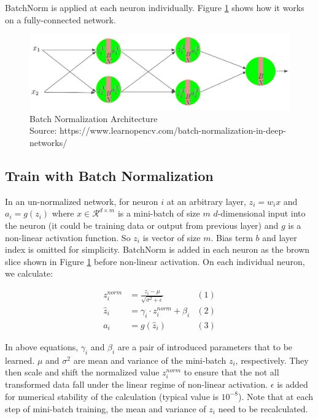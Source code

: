 \documentclass{article}
\begin{document}
BatchNorm is applied at each neuron individually. Figure \ref{fig:batchnorm} shows how it works on a fully-connected network. 


\begin{figure}[h]
	\centering
    \includegraphics[width=\textwidth]{pics/batchNorm/batch-normalization.jpg}
	\caption{Batch Normalization Architecture\\Source: https://www.learnopencv.com/batch-normalization-in-deep-networks/}
	\label{fig:batchnorm}
\end{figure}

\subsection{Train with Batch Normalization}
In an un-normalized network, for neuron $i$ at an arbitrary layer, $z_i=w_ix$ and $a_i=g(z_i)$ where $x\in\mathcal{R}^{d\times m}$ is a mini-batch of size $m$ $d$-dimensional input into the neuron (it could be training data or output from previous layer) and $g$ is a non-linear activation function. So $z_i$ is vector of size $m$. Bias term $b$ and layer index is omitted for simplicity. BatchNorm is added in each neuron as the brown slice shown in Figure \ref{fig:batchnorm} before non-linear activation. On each individual neuron, we calculate:

\begin{align*}
    z_i^{norm}& = \frac{z_i-\mu}{\sqrt{\sigma^2+\epsilon}}  &(1)\\
    \hat{z}_i&= \gamma_i\cdot z_i^{norm}+\beta_i  &(2)\\
    a_i&=g(\hat{z}_i) &(3)
\end{align*}

In above equations, $\gamma_i$ and $\beta_i$ are a pair of introduced parameters that to be learned. $\mu$ and $\sigma^2$ are mean and variance of the mini-batch $z_i$, respectively. They then scale and shift the normalized value $z_i^{norm}$ to ensure that the not all transformed data fall under the linear regime of non-linear activation. $\epsilon$ is added for numerical stability of the calculation (typical value is $10^{-8}$). Note that at each step of mini-batch training, the mean and variance of $z_i$ need to be recalculated.
\end{document}
